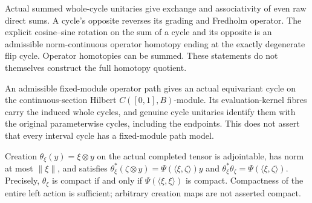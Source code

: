 \begin{proposition}\label{prop:cycle-sum-unitaries-and-inverse-rotation}
\leanok
Actual summed whole-cycle unitaries give exchange and associativity of
even raw direct sums. A cycle's opposite reverses its grading and Fredholm
operator. The explicit cosine--sine rotation on the sum of a cycle and its
opposite is an admissible norm-continuous operator homotopy ending at
the exactly degenerate flip cycle. Operator homotopies can be summed.
These statements do not themselves construct the full homotopy quotient.
\end{proposition}

\begin{proposition}\label{prop:operator-path-as-interval-cycle}
\leanok
An admissible fixed-module operator path gives an actual equivariant cycle
on the continuous-section Hilbert $C([0,1],B)$-module. Its evaluation-kernel
fibres carry the induced whole cycles, and genuine cycle unitaries identify
them with the original parameterwise cycles, including the endpoints.
This does not assert that every interval cycle has a fixed-module path model.
\end{proposition}

\begin{proposition}\label{prop:interior-tensor-creation}
\leanok
Creation $\theta_\xi(y)=\xi\otimes y$ on the actual completed tensor is
adjointable, has norm at most $\|\xi\|$, and satisfies
$\theta_\xi^*(\zeta\otimes y)=\Psi(\langle\xi,\zeta\rangle)y$ and
$\theta_\xi^*\theta_\zeta=\Psi(\langle\xi,\zeta\rangle)$.
Precisely, $\theta_\xi$ is compact if and only if
$\Psi(\langle\xi,\xi\rangle)$ is compact. Compactness of the entire left
action is sufficient; arbitrary creation maps are not asserted compact.
\end{proposition}

